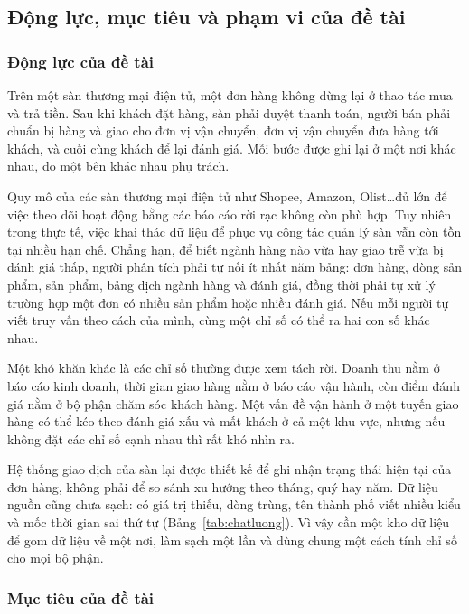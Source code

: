 \subsection{Động lực, mục tiêu và phạm vi của đề tài}

\subsubsection{Động lực của đề tài}

Trên một sàn thương mại điện tử, một đơn hàng không dừng lại ở thao tác mua và trả tiền. Sau khi khách đặt hàng, sàn phải duyệt thanh toán, người bán phải chuẩn bị hàng và giao cho đơn vị vận chuyển, đơn vị vận chuyển đưa hàng tới khách, và cuối cùng khách để lại đánh giá. Mỗi bước được ghi lại ở một nơi khác nhau, do một bên khác nhau phụ trách.

Quy mô của các sàn thương mại điện tử như Shopee, Amazon, Olist\dots đủ lớn để việc theo dõi hoạt động bằng các báo cáo rời rạc không còn phù hợp. Tuy nhiên trong thực tế, việc khai thác dữ liệu để phục vụ công tác quản lý sàn vẫn còn tồn tại nhiều hạn chế. Chẳng hạn, để biết ngành hàng nào vừa hay giao trễ vừa bị đánh giá thấp, người phân tích phải tự nối ít nhất năm bảng: đơn hàng, dòng sản phẩm, sản phẩm, bảng dịch ngành hàng và đánh giá, đồng thời phải tự xử lý trường hợp một đơn có nhiều sản phẩm hoặc nhiều đánh giá. Nếu mỗi người tự viết truy vấn theo cách của mình, cùng một chỉ số có thể ra hai con số khác nhau.

Một khó khăn khác là các chỉ số thường được xem tách rời. Doanh thu nằm ở báo cáo kinh doanh, thời gian giao hàng nằm ở báo cáo vận hành, còn điểm đánh giá nằm ở bộ phận chăm sóc khách hàng. Một vấn đề vận hành ở một tuyến giao hàng có thể kéo theo đánh giá xấu và mất khách ở cả một khu vực, nhưng nếu không đặt các chỉ số cạnh nhau thì rất khó nhìn ra.

Hệ thống giao dịch của sàn lại được thiết kế để ghi nhận trạng thái hiện tại của đơn hàng, không phải để so sánh xu hướng theo tháng, quý hay năm. Dữ liệu nguồn cũng chưa sạch: có giá trị thiếu, dòng trùng, tên thành phố viết nhiều kiểu và mốc thời gian sai thứ tự (Bảng~\ref{tab:chatluong}). Vì vậy cần một kho dữ liệu để gom dữ liệu về một nơi, làm sạch một lần và dùng chung một cách tính chỉ số cho mọi bộ phận.

\subsubsection{Mục tiêu của đề tài}

